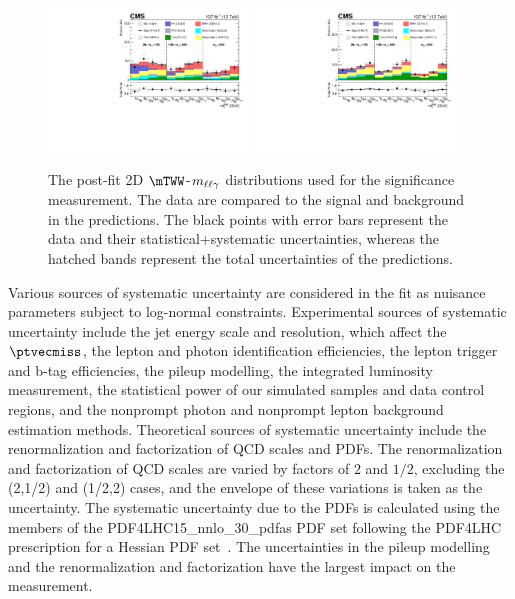 \begin{figure}[htp]
    \begin{center}
      
      \includegraphics[width=0.48\textwidth]{unblind_SRCR/2D_fit/aa_0jetsrun2.pdf}
      \includegraphics[width=0.48\textwidth]{unblind_SRCR/2D_fit/aa_1morejetsrun2.pdf}
    \caption{The post-fit 2D $\mTWW$-$m_{\ell\ell\gamma}$ distributions used for the significance measurement. The data are compared to the signal and background in the predictions. The black points with error bars represent the data and their statistical+systematic uncertainties, whereas the hatched bands represent the total uncertainties of the predictions.}
        \label{fig:2dfitrun2}
    \end{center}
\end{figure}

Various sources of systematic uncertainty are considered in the fit as nuisance parameters subject to log-normal constraints. Experimental sources of systematic uncertainty include the jet energy scale and resolution, which affect the $\ptvecmiss$, the lepton and photon identification efficiencies, the lepton trigger and b-tag efficiencies, the pileup modelling, the integrated luminosity measurement, the statistical power of our simulated samples and data control regions, and the nonprompt photon and nonprompt lepton background estimation methods. Theoretical sources of systematic uncertainty include the renormalization and factorization of QCD scales and PDFs. The renormalization and factorization of QCD scales are varied by factors of $2$ and $1/2$, excluding the (2,1/2) and (1/2,2) cases, and the envelope of these variations is taken as the uncertainty. The systematic uncertainty due to the PDFs is calculated using the members of the PDF4LHC15\_nnlo\_30\_pdfas PDF set following the PDF4LHC prescription for a Hessian PDF set~\cite{Butterworth_2016,Harland_Lang_2015,Ball_2015,PhysRevD.93.033006}. The uncertainties in the pileup modelling and the renormalization and factorization have the largest impact on the measurement.

